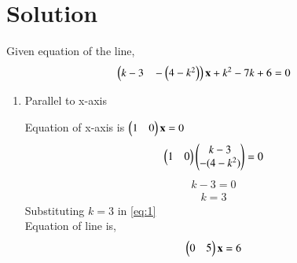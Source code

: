 \documentclass[journal,12pt,twocolumn]{IEEEtran}
\begin{document}
\section{\textbf {Solution}}
Given equation of the line, 
\begin{align}
\begin{pmatrix}k-3 \hspace{3mm}-\begin{pmatrix}4-k^2\end{pmatrix}\end{pmatrix}\mathbf{x}+k^2-7k+6=0\label{eq:1}
\end{align}
\begin{enumerate}
    \item Parallel to x-axis


Equation of x-axis is $\begin{pmatrix}1 & 0\end{pmatrix}\mathbf{x}=0$\\
\begin{align}
  \begin{pmatrix}1 & 0\end{pmatrix}\begin{pmatrix}k-3\\-(4-k^2)\end{pmatrix} =0
\end{align}
\begin{align}
   k-3=0
\end{align}
\begin{align}
    k=3
\end{align}
Substituting $k=3$ in \eqref{eq:1}\\
Equation of line is,
\begin{align}
     \begin{pmatrix}0 & 5\end{pmatrix}\mathbf{x}=6
\end{align}
 

\end{enumerate}
\end{document}

